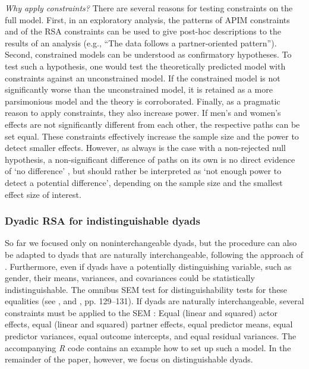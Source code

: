 \documentclass[jou,a4paper,draftfirst]{apa6}
\newcommand{\added}[1]{#1}
\begin{document}
\emph{Why apply constraints?}
There are several reasons for testing constraints on the full model. First, in an exploratory analysis, the patterns of APIM constraints and of the RSA constraints can be used to give post-hoc descriptions to the results of an analysis (e.g., ``The data follows a partner-oriented pattern''). Second, constrained models can be understood as confirmatory hypotheses. To test such a hypothesis, one would test the theoretically predicted model with constraints against an unconstrained model. If the constrained model is not significantly worse than the unconstrained model, it is retained as a more parsimonious model and the theory is corroborated. Finally, as a pragmatic reason to apply constraints, they also increase power. If men's and women's effects are not significantly different from each other, the respective paths can be set equal. These constraints effectively increase the sample size and the power to detect smaller effects. However, as always is the case with a non-rejected null hypothesis, a non-significant difference of paths on its own is no direct evidence of `no difference' \parencite[e.g.,][]{goodman_dirty_2008}, but should rather be interpreted as `not enough power to detect a potential difference', depending on the sample size and the smallest effect size of interest.

\subsubsection{Dyadic RSA for indistinguishable dyads}
\added{So far we focused only on noninterchangeable dyads, but the procedure can also be adapted to dyads that are naturally interchangeable, following the approach of \textcite{olsen_structural_2006}. Furthermore, even if dyads have a potentially distinguishing variable, such as gender, their means, variances, and covariances could be statistically indistinguishable. The omnibus SEM test for distinguishability tests for these equalities (see \nptextcite{gonzalez_correlational_1999}, and \nptextcite{kenny_dyadic_2006}, pp. 129--131). If dyads are naturally interchangeable, several constraints must be applied to the SEM \parencite{olsen_structural_2006}: Equal (linear and squared) actor effects, equal (linear and squared) partner effects, equal predictor means, equal predictor variances, equal outcome intercepts, and equal residual variances. The accompanying \textit{R} code contains an example how to set up such a model. In the remainder of the paper, however, we focus on distinguishable dyads.}
\end{document}
